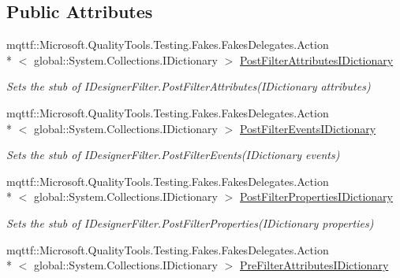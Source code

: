 \subsection*{Public Attributes}
\begin{DoxyCompactItemize}
\item 
mqttf\-::\-Microsoft.\-Quality\-Tools.\-Testing.\-Fakes.\-Fakes\-Delegates.\-Action\\*
$<$ global\-::\-System.\-Collections.\-I\-Dictionary $>$ \hyperlink{class_system_1_1_component_model_1_1_design_1_1_fakes_1_1_stub_i_designer_filter_a377adbfeb85b36a955a0b001af33c5aa}{Post\-Filter\-Attributes\-I\-Dictionary}
\begin{DoxyCompactList}\small\item\em Sets the stub of I\-Designer\-Filter.\-Post\-Filter\-Attributes(\-I\-Dictionary attributes)\end{DoxyCompactList}\item 
mqttf\-::\-Microsoft.\-Quality\-Tools.\-Testing.\-Fakes.\-Fakes\-Delegates.\-Action\\*
$<$ global\-::\-System.\-Collections.\-I\-Dictionary $>$ \hyperlink{class_system_1_1_component_model_1_1_design_1_1_fakes_1_1_stub_i_designer_filter_a8fac60b37f51cf99cb73e986c335be27}{Post\-Filter\-Events\-I\-Dictionary}
\begin{DoxyCompactList}\small\item\em Sets the stub of I\-Designer\-Filter.\-Post\-Filter\-Events(\-I\-Dictionary events)\end{DoxyCompactList}\item 
mqttf\-::\-Microsoft.\-Quality\-Tools.\-Testing.\-Fakes.\-Fakes\-Delegates.\-Action\\*
$<$ global\-::\-System.\-Collections.\-I\-Dictionary $>$ \hyperlink{class_system_1_1_component_model_1_1_design_1_1_fakes_1_1_stub_i_designer_filter_a25b44ce8e5324a6b67bdf3610d5a19d2}{Post\-Filter\-Properties\-I\-Dictionary}
\begin{DoxyCompactList}\small\item\em Sets the stub of I\-Designer\-Filter.\-Post\-Filter\-Properties(\-I\-Dictionary properties)\end{DoxyCompactList}\item 
mqttf\-::\-Microsoft.\-Quality\-Tools.\-Testing.\-Fakes.\-Fakes\-Delegates.\-Action\\*
$<$ global\-::\-System.\-Collections.\-I\-Dictionary $>$ \hyperlink{class_system_1_1_component_model_1_1_design_1_1_fakes_1_1_stub_i_designer_filter_a579a0e01fe444bf4df97dc2c944204da}{Pre\-Filter\-Attributes\-I\-Dictionary}

\end{DoxyCompactItemize}
